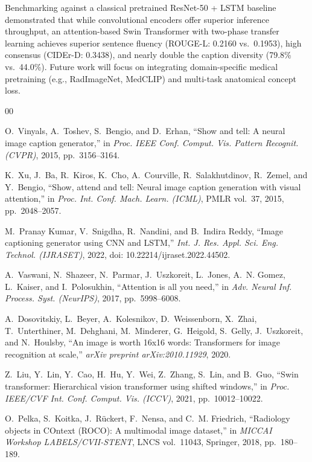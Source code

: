 \documentclass[conference]{IEEEtran}
\begin{document}
Benchmarking against a classical pretrained ResNet-50 + LSTM baseline demonstrated that while convolutional encoders offer superior inference throughput, an attention-based Swin Transformer with two-phase transfer learning achieves superior sentence fluency (ROUGE-L: 0.2160 vs.\ 0.1953), high consensus (CIDEr-D: 0.3438), and nearly double the caption diversity (79.8\% vs.\ 44.0\%). Future work will focus on integrating domain-specific medical pretraining (e.g., RadImageNet, MedCLIP) and multi-task anatomical concept loss.

\begin{thebibliography}{00}

O.~Vinyals, A.~Toshev, S.~Bengio, and D.~Erhan, ``Show and tell: A neural image caption generator,'' in \emph{Proc. IEEE Conf. Comput. Vis. Pattern Recognit. (CVPR)}, 2015, pp.~3156--3164.

K.~Xu, J.~Ba, R.~Kiros, K.~Cho, A.~Courville, R.~Salakhutdinov, R.~Zemel, and Y.~Bengio, ``Show, attend and tell: Neural image caption generation with visual attention,'' in \emph{Proc. Int. Conf. Mach. Learn. (ICML)}, PMLR vol.~37, 2015, pp.~2048--2057.

M.~Pranay Kumar, V.~Snigdha, R.~Nandini, and B.~Indira Reddy, ``Image captioning generator using CNN and LSTM,'' \emph{Int. J. Res. Appl. Sci. Eng. Technol. (IJRASET)}, 2022, doi: 10.22214/ijraset.2022.44502.

A.~Vaswani, N.~Shazeer, N.~Parmar, J.~Uszkoreit, L.~Jones, A.~N. Gomez, L.~Kaiser, and I.~Polosukhin, ``Attention is all you need,'' in \emph{Adv. Neural Inf. Process. Syst. (NeurIPS)}, 2017, pp.~5998--6008.

A.~Dosovitskiy, L.~Beyer, A.~Kolesnikov, D.~Weissenborn, X.~Zhai, T.~Unterthiner, M.~Dehghani, M.~Minderer, G.~Heigold, S.~Gelly, J.~Uszkoreit, and N.~Houlsby, ``An image is worth 16x16 words: Transformers for image recognition at scale,'' \emph{arXiv preprint arXiv:2010.11929}, 2020.

Z.~Liu, Y.~Lin, Y.~Cao, H.~Hu, Y.~Wei, Z.~Zhang, S.~Lin, and B.~Guo, ``Swin transformer: Hierarchical vision transformer using shifted windows,'' in \emph{Proc. IEEE/CVF Int. Conf. Comput. Vis. (ICCV)}, 2021, pp.~10012--10022.

O.~Pelka, S.~Koitka, J.~Rückert, F.~Nensa, and C.~M. Friedrich, ``Radiology objects in COntext (ROCO): A multimodal image dataset,'' in \emph{MICCAI Workshop LABELS/CVII-STENT}, LNCS vol.~11043, Springer, 2018, pp.~180--189.


\end{thebibliography}
\end{document}
